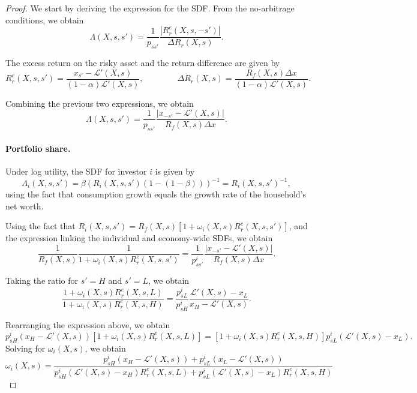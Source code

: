 \begin{proof} 
    We start by deriving the expression for the SDF. From the no-arbitrage conditions, we obtain
\begin{equation}
    \Lambda(X,s,s') = \frac{1}{p_{ss'}} \frac{|R_r^e(X,s,-s')|}{\Delta R_r(X,s)}.
\end{equation}

The excess return on the risky asset and the return difference are given by
\begin{equation}
    R_r^e(X,s,s') = \frac{x_{s'} -\mathcal{L}'(X,s)}{(1-\alpha)\mathcal{L}'(X,s)}, \qquad \qquad
    \Delta R_r(X,s)  = \frac{R_f(X,s) \Delta x}{(1-\alpha) \mathcal{L}'(X,s)}.
\end{equation}

Combining the previous two expressions, we obtain
\begin{equation}
    \Lambda(X,s,s') = \frac{1}{p_{ss'}} \frac{|x_{-s'} - \mathcal{L}'(X,s)|}{R_f(X,s) \Delta x}.
\end{equation}

\paragraph{Portfolio share.} Under log utility, the SDF for investor $i$ is given by
\begin{equation}
    \Lambda_i(X,s,s') = \beta \left( R_{i}(X,s,s') (1- (1-\beta)) \right)^{-1} = R_i(X,s,s')^{-1},
\end{equation}
using the fact that consumption growth equals the growth rate of the household's net worth. 

Using the fact that $R_i(X,s,s') = R_f(X,s) \left[1 + \omega_i(X,s) R_r^e(X,s,s') \right]$, and the expression linking the individual and economy-wide SDFs, we obtain
\begin{equation}
    \frac{1}{R_f(X,s)} \frac{1}{1+\omega_i(X,s) R_r^e(X,s,s')} = \frac{1}{p_{ss'}^i} \frac{|x_{-s'} - \mathcal{L}'(X,s)|}{R_f(X,s) \Delta x}.
\end{equation}

Taking the ratio for $s' = H$ and $s' = L$, we obtain
\begin{equation}
    \frac{1+\omega_i(X,s) R_r^e(X,s,L)}{1+\omega_i(X,s) R_r^e(X,s,H)} = \frac{p_{sL}^i}{p_{sH}^i} \frac{\mathcal{L}'(X,s) - x_L}{x_H-\mathcal{L}'(X,s)}.
\end{equation}

Rearranging the expression above, we obtain
\begin{equation}
    p_{sH}^i(x_H-\mathcal{L}'(X,s))\left[1+\omega_i(X,s) R_r^e(X,s,L)\right] = \left[ 1+\omega_i(X,s) R_r^e(X,s,H)\right]p_{sL}^i(\mathcal{L}'(X,s) - x_L).
\end{equation}
Solving for $\omega_i(X,s)$, we obtain
\begin{equation}
    \omega_i(X,s) = \frac{p_{sH}^i(x_H-\mathcal{L}'(X,s)) +p_{sL}^i(x_L - \mathcal{L}'(X,s))}{        p_{sH}^i(\mathcal{L}'(X,s) - x_H) R_r^e(X,s,L) + 
    p_{sL}^i(\mathcal{L}'(X,s) - x_L) R_r^e(X,s,H)} 
\end{equation}


\end{proof}
